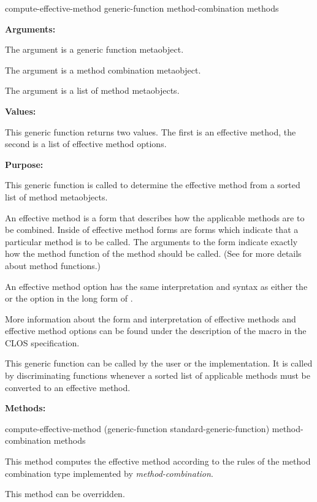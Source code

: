 \begin{defun}
compute-effective-method generic-function method-combination methods

\textbf{Arguments:}

The  argument is a generic function metaobject.

The  argument is a method combination metaobject.

The  argument is a list of method metaobjects.

\textbf{Values:}

This generic function returns two values. The first is an effective method, the
second is a list of effective method options.

\textbf{Purpose:}

This generic function is called to determine the effective method from a sorted
list of method metaobjects.

An effective method is a form that describes how the applicable methods are to
be combined. Inside of effective method forms are  forms which
indicate that a particular method is to be called. The arguments to the
 form indicate exactly how the method function of the method
should be called. (See  for more details about method
functions.)

An effective method option has the same interpretation and syntax as either the
 or the  option in the long form of
.

More information about the form and interpretation of effective methods and
effective method options can be found under the description of the
 macro in the CLOS specification.

This generic function can be called by the user or the implementation. It is
called by discriminating functions whenever a sorted list of applicable methods
must be converted to an effective method.

\textbf{Methods:}

\begin{defun}
compute-effective-method (generic-function standard-generic-function) method-combination methods

This method computes the effective method according to the rules of the method
combination type implemented by \emph{method-combination}.

This method can be overridden.
\end{defun}
\end{defun}

